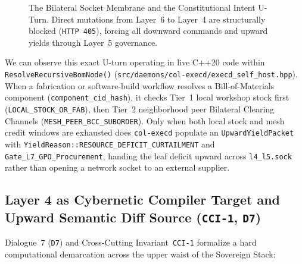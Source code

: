 \begin{figure}[htbp]
\caption{The Bilateral Socket Membrane and the Constitutional Intent U-Turn. Direct mutations from Layer~6 to Layer~4 are structurally blocked (\texttt{HTTP 405}), forcing all downward commands and upward yields through Layer~5 governance.}
\label{fig:ch1-bilateral-uturn}
\end{figure}

We can observe this exact U-turn operating in live C++20 code within
\texttt{ResolveRecursiveBomNode()} (\texttt{src/daemons/col-execd/execd\_self\_host.hpp}).
When a fabrication or software-build workflow resolves a Bill-of-Materials component
(\texttt{component\_cid\_hash}), it checks Tier~1 local workshop stock first
(\texttt{LOCAL\_STOCK\_OR\_FAB}), then Tier~2 neighborhood peer Bilateral Clearing Channels
(\texttt{MESH\_PEER\_BCC\_SUBORDER}). Only when both local stock and mesh credit windows are
exhausted does \texttt{col-execd} populate an \texttt{UpwardYieldPacket} with
\texttt{YieldReason::RESOURCE\_DEFICIT\_CURTAILMENT} and
\texttt{Gate\_L7\_GPO\_Procurement}, handing the leaf deficit upward across
\texttt{l4\_l5.sock} rather than opening a network socket to an external supplier.

\subsection{Layer 4 as Cybernetic Compiler Target and Upward Semantic Diff Source (\texttt{CCI-1}, \texttt{D7})}
\label{subsec:ch1-compiler-decompiler}

Dialogue~7 (\texttt{D7}) and Cross-Cutting Invariant~\texttt{CCI-1} formalize a hard
computational demarcation across the upper waist of the Sovereign Stack:

